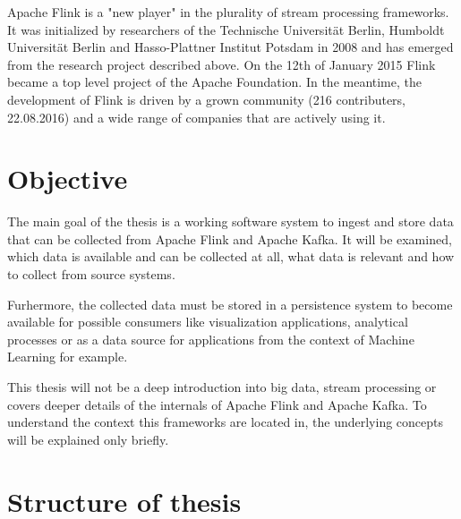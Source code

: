 Apache Flink is a "new player" in the plurality of stream processing frameworks. It was
initialized by researchers of the Technische Universität Berlin, Humboldt Universität
Berlin and Hasso-Plattner Institut Potsdam in 2008 and has emerged from the research project described
above.  On the 12th of January 2015 Flink became a top level project of the Apache Foundation. In the
meantime, the development of Flink is driven by a grown community (216 contributers, 22.08.2016) and
a wide range of companies that are actively using it.

\section{Objective}

The main goal of the thesis is a working software system to ingest and store data that can be collected
from Apache Flink and Apache Kafka. It will be examined, which data is available and can be collected
at all, what data is relevant and how to collect from source systems.

Furhermore, the collected data must be stored in a persistence system to become available
for possible consumers like visualization applications, analytical processes or as a data
source for applications from the context of Machine Learning for example.

This thesis will not be a deep introduction into big data, stream processing or covers deeper
details of the internals of Apache Flink and Apache Kafka. To understand the context this
frameworks are located in, the underlying concepts will be explained only briefly.

%
\section{Structure of thesis}

